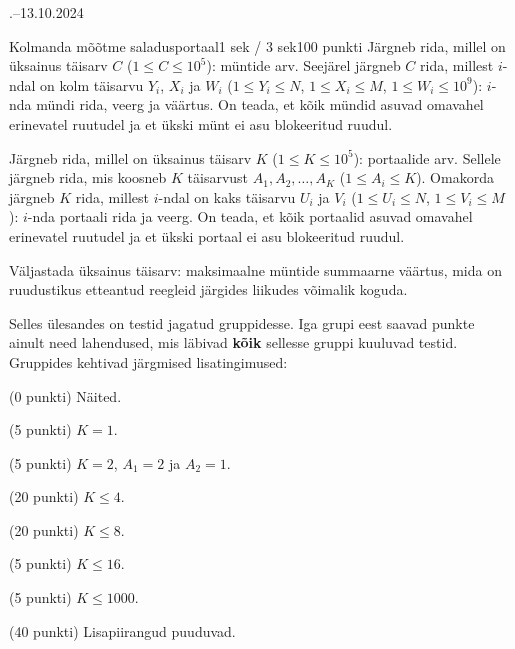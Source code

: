 \documentclass[a4paper,11pt]{article}
\begin{document}
\begin{ol}{\eio}{.--13.10.2024}{\yle}{}
\begin{yl}{5}{Kolmanda mõõtme saladus}{portaal}{1 sek / 3 sek}{100 punkti}
    Järgneb rida, millel on üksainus täisarv $C$ ($1 \le C \le 10^5$): müntide arv. Seejärel
    järgneb $C$ rida, millest $i$-ndal on kolm täisarvu $Y_i$, $X_i$ ja $W_i$
    ($1 \le Y_i \le N$, $1 \le X_i \le M$, $1 \le W_i \le 10^9$):
    $i$-nda mündi rida, veerg ja väärtus. On teada, et kõik mündid asuvad omavahel
    erinevatel ruutudel ja et ükski münt ei asu blokeeritud ruudul.

    Järgneb rida, millel on üksainus täisarv $K$ ($1 \le K \le 10^5$): portaalide arv.
    Sellele järgneb rida, mis koosneb $K$ täisarvust $A_1, A_2, \ldots, A_K$
    ($1 \le A_i \le K$). Omakorda järgneb $K$ rida, millest $i$-ndal on kaks täisarvu
    $U_i$ ja $V_i$ ($1 \le U_i \le N$, $1 \le V_i \le M$): $i$-nda portaali rida ja veerg.
    On teada, et kõik portaalid asuvad omavahel erinevatel ruutudel
    ja et ükski portaal ei asu blokeeritud ruudul.

    \val Väljastada üksainus täisarv: maksimaalne müntide summaarne väärtus, mida on
    ruudustikus etteantud reegleid järgides liikudes võimalik koguda.

    \hnd Selles ülesandes on testid jagatud gruppidesse. Iga grupi eest saavad punkte
    ainult need lahendused, mis läbivad \textbf{kõik} sellesse gruppi kuuluvad
    testid. Gruppides kehtivad järgmised lisatingimused:
    
    \begin{minipage}[t]{0.45\textwidth}
      \begin{xenum}
      \item (0 punkti) Näited.
      \item (5 punkti) $K = 1$.
      \item (5 punkti) $K = 2$, $A_1 = 2$ ja $A_2 = 1$.
      \item (20 punkti) $K \le 4$.
      \end{xenum}
    \end{minipage}
    \begin{minipage}[t]{0.45\textwidth}
      \begin{xenum}
        \setcounter{enumi}{4}
      \item (20 punkti) $K \le 8$.
      \item (5 punkti) $K \le 16$.
      \item (5 punkti) $K \le 1000$.
      \item (40 punkti) Lisapiirangud puuduvad.
      \end{xenum}
    \end{minipage}


\end{yl}
\end{ol}
\end{document}

